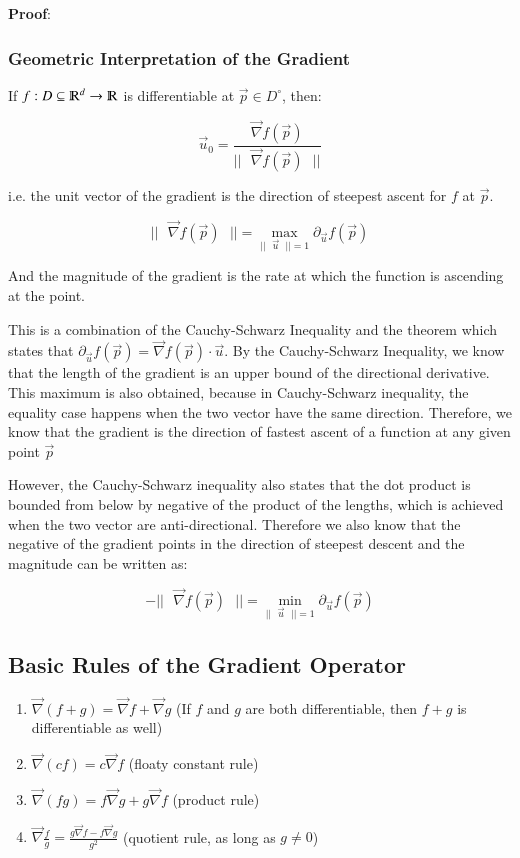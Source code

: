 \documentclass [12 pt, twoside] {book}
\newcommand\+{\text{ }}
\newcommand{\gradient}{\vec{\nabla}}
\begin{document}
\textbf{Proof}: %

\subsubsection{Geometric Interpretation of the Gradient}
If $f: D \subseteq \varmathbb{R}^d \to \varmathbb{R}$ is differentiable at
$\vec{p} \in D^\circ$, then:

$$\vec{u}_0 = \frac{\vec{\nabla}f(\vec{p})}{||\+\vec{\nabla}f(\vec{p})\+||}$$

i.e. the unit vector of the gradient is the direction of steepest ascent for $f$
at $\vec{p}$.

$$||\+\vec{\nabla}f(\vec{p})\+|| = \max_{||\+\vec{u}\+|| = 1}
\partial_{\vec{u}}f(\vec{p})$$

And the magnitude of the gradient is the rate at which the function is ascending
at the point.

This is a combination of the Cauchy-Schwarz Inequality and the theorem which states that
$\partial_{\vec{u}}f(\vec{p}) = \vec{\nabla}f(\vec{p}) \cdot \vec{u}$.
By the Cauchy-Schwarz Inequality, we know that the length of the gradient is an
upper bound of the directional derivative. This maximum is also obtained,
because in Cauchy-Schwarz inequality, the equality case happens when the two
vector have the same direction. Therefore, we know that the gradient is the direction of
fastest ascent of a function at any given point $\vec{p}$

However, the Cauchy-Schwarz inequality also states that the dot product is
bounded from below by negative of the product of the lengths, which is achieved
when the two vector are anti-directional. Therefore we also know that the
negative of the gradient points in the direction of steepest descent and the
magnitude can be written as:

$$-||\+\vec{\nabla}f(\vec{p})\+|| = \min_{||\+\vec{u}\+|| = 1} \partial_{\vec{u}}
f(\vec{p})$$

\subsection{Basic Rules of the Gradient Operator}
\begin{enumerate}
    \item $\gradient (f + g) = \gradient f + \gradient g$ (If $f$ and
        $g$ are both differentiable, then $f + g$ is differentiable as well)
    \item $\gradient (cf) = c \gradient f$ (floaty constant rule)
    \item $\gradient (fg) = f \gradient g + g \gradient f$ (product rule)
    \item $\gradient \frac{f}{g} = \frac{g \gradient f - f\gradient g}{g^2}$ (quotient rule, as long as $g \neq 0$)
\end{enumerate}
\end{document}
